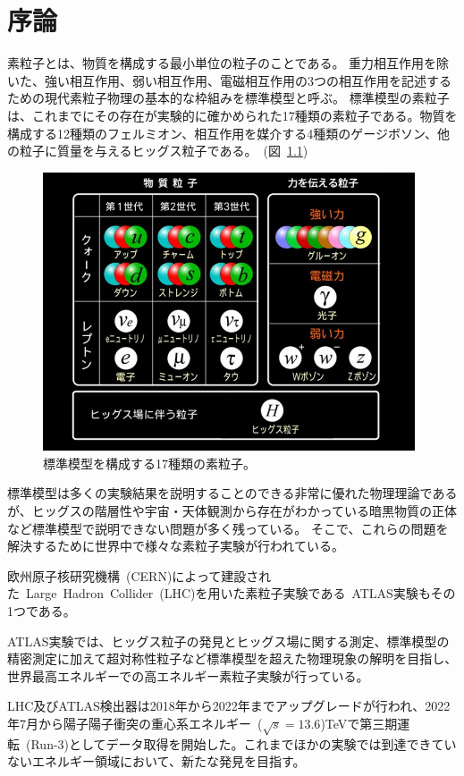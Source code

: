 \chapter{序論}
素粒子とは、物質を構成する最小単位の粒子のことである。
重力相互作用を除いた、強い相互作用、弱い相互作用、電磁相互作用の3つの相互作用を記述するための現代素粒子物理の基本的な枠組みを標準模型と呼ぶ。
標準模型の素粒子は、これまでにその存在が実験的に確かめられた17種類の素粒子である。物質を構成する12種類のフェルミオン、相互作用を媒介する4種類のゲージボソン、他の粒子に質量を与えるヒッグス粒子である。~(図~\ref{fig:1-1})

\begin{figure}[H]
  \centering
  \includegraphics[clip, width=11cm]{fig/1/standardmodel_v2.jpg}
  \caption{標準模型を構成する17種類の素粒子。\cite{article:ATLAS_japan}}
  \label{fig:1-1}
\end{figure}

\newpage

標準模型は多くの実験結果を説明することのできる非常に優れた物理理論であるが、ヒッグスの階層性や宇宙・天体観測から存在がわかっている暗黒物質の正体など標準模型で説明できない問題が多く残っている。
そこで、これらの問題を解決するために世界中で様々な素粒子実験が行われている。

欧州原子核研究機構~(CERN)\cite{article:CERN}によって建設された~Large~Hadron~Collider~(LHC)\cite{article:LHC}を用いた素粒子実験である~ATLAS実験\cite{article:ATLAS}もその1つである。

ATLAS実験では、ヒッグス粒子の発見とヒッグス場に関する測定、標準模型の精密測定に加えて超対称性粒子など標準模型を超えた物理現象の解明を目指し、世界最高エネルギーでの高エネルギー素粒子実験が行っている。

LHC及びATLAS検出器は2018年から2022年までアップグレードが行われ、2022年7月から陽子陽子衝突の重心系エネルギー~($\sqrt{s}=13.6$)TeVで第三期運転~(Run-3)としてデータ取得を開始した。これまでほかの実験では到達できていないエネルギー領域において、新たな発見を目指す。